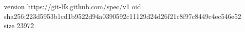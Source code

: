 version https://git-lfs.github.com/spec/v1
oid sha256:223d5953b1cd1b9522d94a0390592c11129d24d26f21c8f97c8449c4ec546e52
size 23972
